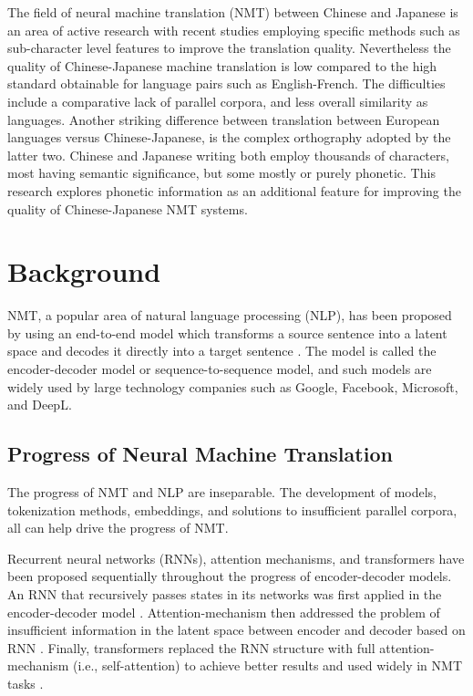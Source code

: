 \hspace{24pt}

The field of neural machine translation (NMT) between Chinese and Japanese is an area of active research with recent studies employing specific methods such as sub-character level features to improve the translation quality.  Nevertheless the quality of Chinese-Japanese machine translation is low compared to the high standard obtainable for language pairs such as English-French.  The difficulties include a comparative lack of parallel corpora, and less overall similarity as languages.  Another striking difference between translation between European languages versus Chinese-Japanese, is the complex orthography adopted by the latter two.  Chinese and Japanese writing both employ thousands of characters, most having semantic significance, but some mostly or purely phonetic.
This research explores phonetic information as an additional feature for improving the quality of Chinese-Japanese NMT systems.

\section{Background} \label{sec:background}

NMT, a popular area of natural language processing (NLP), has been proposed by using an end-to-end model which transforms a source sentence into a latent space and decodes it directly into a target sentence \cite{sutskever2014sequence, cho2014learning}. The model is called the encoder-decoder model or sequence-to-sequence model, and such models are widely used by large technology companies such as Google, Facebook, Microsoft, and DeepL.

\subsection{Progress of Neural Machine Translation} \label{sec:nmt}

The progress of NMT and NLP are inseparable. The development of models, tokenization methods, embeddings, and solutions to insufficient parallel corpora, all can help drive the progress of NMT.

Recurrent neural networks (RNNs), attention mechanisms, and transformers have been proposed sequentially throughout the progress of encoder-decoder models.  An RNN that recursively passes states in its networks was first applied in the encoder-decoder model \cite{cho2014learning}. Attention-mechanism then addressed the problem of insufficient information in the latent space between encoder and decoder based on RNN \cite{bahdanau2014neural}.  Finally, transformers replaced the RNN structure with full attention-mechanism (i.e., self-attention) to achieve better results and used widely in NMT tasks \cite{NIPS2017_3f5ee243}. 

